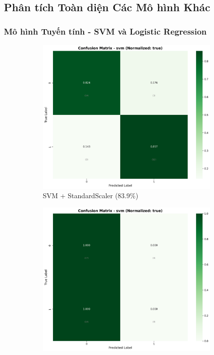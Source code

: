 \subsection{Phân tích Toàn diện Các Mô hình Khác}

\subsubsection{Mô hình Tuyến tính - SVM và Logistic Regression}

\begin{figure}[H]
\centering
\begin{subfigure}[b]{0.315\textwidth}
\centering
\includegraphics[width=1\textwidth]{Result/cleveland_dataset/confusion_matrices/svm_numeric_dataset_StandardScaler.png}
\caption{SVM + StandardScaler (83.9\%)}
\label{fig:svm_standardscaler_complete}
\end{subfigure}
\hfill
\begin{subfigure}[b]{0.315\textwidth}
\centering
\includegraphics[width=1\textwidth]{Result/cleveland_dataset/confusion_matrices/svm_numeric_dataset_MinMaxScaler.png}

\end{subfigure}
\end{figure}

